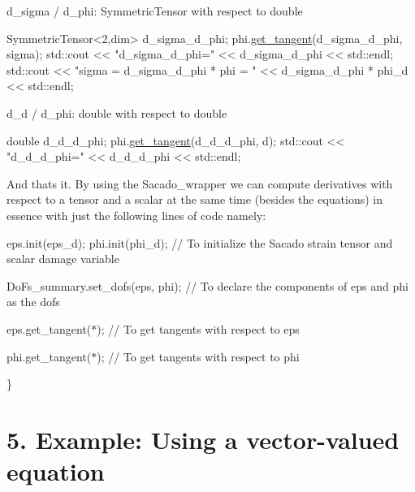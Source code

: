  d\+\_\+sigma / d\+\_\+phi\+: Symmetric\+Tensor with respect to double 
\begin{DoxyCode}
SymmetricTensor<2,dim> d\_sigma\_d\_phi;
phi.\hyperlink{classSacado__Wrapper_1_1SW__double_a2e6eca4457eb22b06172bb5749038f1e}{get\_tangent}(d\_sigma\_d\_phi, sigma);
std::cout << \textcolor{stringliteral}{"d\_sigma\_d\_phi="} << d\_sigma\_d\_phi << std::endl;
std::cout << \textcolor{stringliteral}{"sigma = d\_sigma\_d\_phi * phi = "} << d\_sigma\_d\_phi * phi\_d << std::endl;
\end{DoxyCode}
 d\+\_\+d / d\+\_\+phi\+: double with respect to double 
\begin{DoxyCode}
\textcolor{keywordtype}{double} d\_d\_d\_phi;
phi.\hyperlink{classSacado__Wrapper_1_1SW__double_a2e6eca4457eb22b06172bb5749038f1e}{get\_tangent}(d\_d\_d\_phi, d);
std::cout << \textcolor{stringliteral}{"d\_d\_d\_phi="} << d\_d\_d\_phi << std::endl;
\end{DoxyCode}
 And that\textquotesingle{}s it. By using the Sacado\+\_\+wrapper we can compute derivatives with respect to a tensor and a scalar at the same time (besides the equations) in essence with just the following lines of code namely\+:
\begin{DoxyItemize}
\item eps.\+init(eps\+\_\+d); phi.\+init(phi\+\_\+d); // To initialize the Sacado strain tensor and scalar damage variable
\item Do\+Fs\+\_\+summary.\+set\+\_\+dofs(eps, phi); // To declare the components of eps and phi as the dofs
\item eps.\+get\+\_\+tangent($\ast$); // To get tangents with respect to eps
\item phi.\+get\+\_\+tangent($\ast$); // To get tangents with respect to phi 
\begin{DoxyCode}
\}
\end{DoxyCode}
 
\end{DoxyItemize}\hypertarget{index_Ex5}{}\section{5. Example\+: Using a vector-\/valued equation}\label{index_Ex5}

